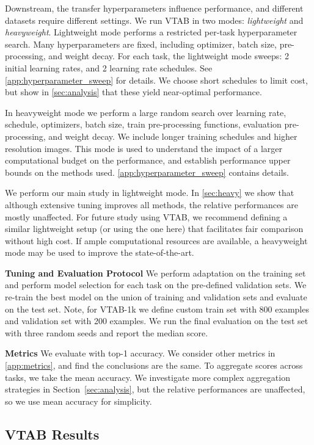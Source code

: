 \documentclass{article}
\newcommand{\myparagraph}[1]{\noindent\textbf{#1}\quad}
\begin{document}
Downstream, the transfer hyperparameters influence performance, and different datasets require different settings.
We run VTAB in two modes: \emph{lightweight} and \emph{heavyweight}.
Lightweight mode performs a restricted per-task hyperparameter search.
Many hyperparameters are fixed, including optimizer, batch size, pre-processing, and weight decay.
For each task, the lightweight mode sweeps: 2 initial learning rates, and 2 learning rate schedules. See \cref{app:hyperparameter_sweep} for details.
We choose short schedules to limit cost, but show in \cref{sec:analysis} that these yield near-optimal performance.

In heavyweight mode we perform a large random search over learning rate, schedule, optimizers, batch size, train pre-processing functions, evaluation pre-processing, and weight decay.
We include longer training schedules and higher resolution images.
This mode is used to understand the impact of a larger computational budget on the performance, and establish performance upper bounds on the methods used.
\cref{app:hyperparameter_sweep} contains details.

We perform our main study in lightweight mode.
In \cref{sec:heavy} we show that although extensive tuning improves all methods, the relative performances are mostly unaffected.
For future study using VTAB, we recommend defining a similar lightweight setup (or using the one here) that facilitates fair comparison without high cost.
If ample computational resources are available, a heavyweight mode may be used to improve the state-of-the-art.

\myparagraph{Tuning and Evaluation Protocol}
We perform adaptation on the training set and perform model selection for each task on the pre-defined validation sets.
We re-train the best model on the union of training and validation sets and evaluate on the test set.
Note, for VTAB-1k we define custom train set with 800 examples and validation set with 200 examples.
We run the final evaluation on the test set with three random seeds and report the median score.

\myparagraph{Metrics}
We evaluate with top-1 accuracy.
We consider other metrics in \cref{app:metrics}, and find the conclusions are the same.
To aggregate scores across tasks, we take the mean accuracy.
We investigate more complex aggregation strategies in Section~\ref{sec:analysis}, but the relative performances are unaffected, so we use mean accuracy for simplicity.


\subsection{VTAB Results}
\end{document}
